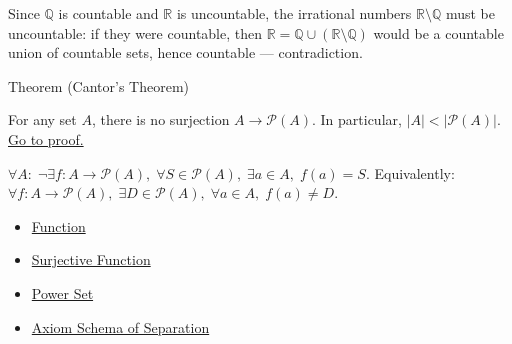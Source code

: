\begin{remark*}[Consequence]
Since $\mathbb{Q}$ is countable and $\mathbb{R}$ is uncountable, the
irrational numbers $\mathbb{R} \setminus \mathbb{Q}$ must be uncountable:
if they were countable, then $\mathbb{R} = \mathbb{Q} \cup (\mathbb{R}
\setminus \mathbb{Q})$ would be a countable union of countable sets, hence
countable --- contradiction.
\end{remark*}


\begin{theorembox}{Theorem (Cantor's Theorem)}
\begin{theorem}\label{thm:cantor}
For any set $A$, there is no surjection $A \to \mathcal{P}(A)$. In
particular, $|A| < |\mathcal{P}(A)|$.
\hyperref[prf:cantor]{Go to proof.}
\end{theorem}
\end{theorembox}

\begin{remark*}
$\forall A:\; \neg\exists f: A\to\mathcal{P}(A),\; \forall S\in\mathcal{P}(A),\; \exists a\in A,\; f(a)=S$. Equivalently: $\forall f: A\to\mathcal{P}(A),\; \exists D\in\mathcal{P}(A),\; \forall a\in A,\; f(a)\neq D$.
\end{remark*}


\begin{dependencies}
\begin{itemize}
  \item \hyperref[def:function]{Function}
  \item \hyperref[def:surjective]{Surjective Function}
  \item \hyperref[def:power-set]{Power Set}
  \item \hyperref[ax:separation]{Axiom Schema of Separation}
\end{itemize}
\end{dependencies}

